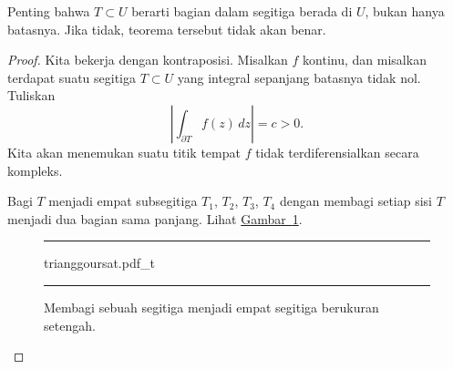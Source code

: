 \documentclass[12pt,openany]{book}
\newcommand{\abs}[1]{\left\lvert {#1} \right\rvert}
\theoremstyle{plain}
\theoremstyle{remark}
\theoremstyle{definition}
\newenvironment{myfig}{%
\begin{figure}[h!t]
\noindent\rule{\textwidth}{0.5pt}\vspace{12pt}\par\centering}%
{\par\noindent\rule{\textwidth}{0.5pt}
\end{figure}}
\theoremstyle{exercise}
\theoremstyle{example}
\newcommand{\figureref}[1]{\hyperref[#1]{Gambar~\ref*{#1}}}
\begin{document}
Penting bahwa $T \subset U$ berarti bagian dalam
segitiga berada di $U$, bukan hanya batasnya.  Jika tidak, teorema tersebut
tidak akan benar.

\begin{proof}
Kita bekerja dengan kontraposisi.
Misalkan $f$ kontinu, dan 
misalkan terdapat suatu segitiga $T \subset U$ yang integral sepanjang batasnya tidak nol.
Tuliskan
\begin{equation*}
\abs{\int_{\partial T} f(z) \, dz} = c > 0 .
\end{equation*}
Kita akan menemukan suatu titik
tempat $f$ tidak terdiferensialkan secara kompleks.

Bagi $T$ menjadi empat subsegitiga
$T_1$, $T_2$, $T_3$, $T_4$ dengan membagi setiap sisi $T$ menjadi dua bagian sama panjang.  Lihat
\figureref{fig:trianggoursat}.
\begin{myfig}
{trianggoursat.pdf_t}
\caption{Membagi sebuah segitiga menjadi empat segitiga berukuran setengah.%
\label{fig:trianggoursat}}
\end{myfig}


\end{proof}
\end{document}
